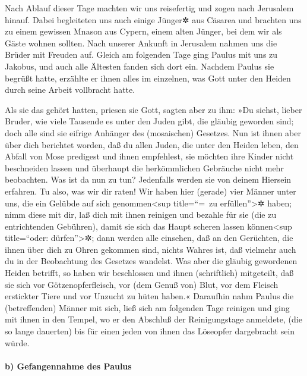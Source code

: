  Nach Ablauf dieser Tage machten wir uns reisefertig und
zogen nach Jerusalem hinauf.  Dabei begleiteten uns auch
einige Jünger✲ aus Cäsarea und brachten uns zu einem gewissen Mnason aus
Cypern, einem alten Jünger, bei dem wir als Gäste wohnen sollten.
 Nach unserer Ankunft in Jerusalem nahmen uns die Brüder
mit Freuden auf.  Gleich am folgenden Tage ging Paulus
mit uns zu Jakobus, und auch alle Ältesten fanden sich dort ein.
 Nachdem Paulus sie begrüßt hatte, erzählte er ihnen
alles im einzelnen, was Gott unter den Heiden durch seine Arbeit
vollbracht hatte.

 Als sie das gehört hatten, priesen sie Gott, sagten aber
zu ihm: »Du siehst, lieber Bruder, wie viele Tausende es unter den Juden
gibt, die gläubig geworden sind; doch alle sind sie eifrige Anhänger des
(mosaischen) Gesetzes.  Nun ist ihnen aber über dich
berichtet worden, daß du allen Juden, die unter den Heiden leben, den
Abfall von Mose predigest und ihnen empfehlest, sie möchten ihre Kinder
nicht beschneiden lassen und überhaupt die herkömmlichen Gebräuche nicht
mehr beobachten.  Was ist da nun zu tun? Jedenfalls
werden sie von deinem Hiersein erfahren.  Tu also, was
wir dir raten! Wir haben hier (gerade) vier Männer unter uns, die ein
Gelübde auf sich genommen\textless sup title=``=~zu
erfüllen''\textgreater✲ haben;  nimm diese mit dir, laß
dich mit ihnen reinigen und bezahle für sie (die zu entrichtenden
Gebühren), damit sie sich das Haupt scheren lassen können\textless sup
title=``oder: dürfen''\textgreater✲; dann werden alle einsehen, daß an
den Gerüchten, die ihnen über dich zu Ohren gekommen sind, nichts Wahres
ist, daß vielmehr auch du in der Beobachtung des Gesetzes wandelst.
 Was aber die gläubig gewordenen Heiden betrifft, so
haben wir beschlossen und ihnen (schriftlich) mitgeteilt, daß sie sich
vor Götzenopferfleisch, vor (dem Genuß von) Blut, vor dem Fleisch
erstickter Tiere und vor Unzucht zu hüten haben.« 
Daraufhin nahm Paulus die (betreffenden) Männer mit sich, ließ sich am
folgenden Tage reinigen und ging mit ihnen in den Tempel, wo er den
Abschluß der Reinigungstage anmeldete, (die so lange dauerten) bis für
einen jeden von ihnen das Löseopfer dargebracht sein würde.

\hypertarget{b-gefangennahme-des-paulus}{%
\paragraph{b) Gefangennahme des
Paulus}\label{b-gefangennahme-des-paulus}}

